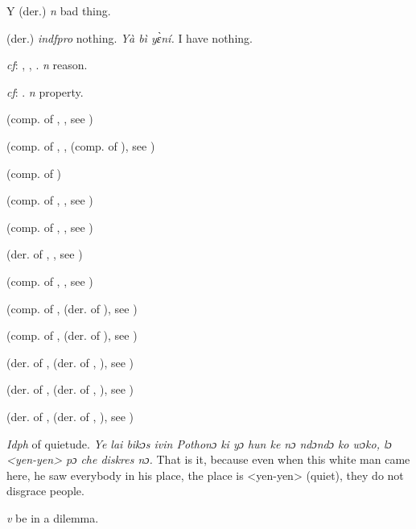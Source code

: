 \begin{letter}{Y}
 (der.) \textit{n} bad thing. 

 (der.) \textit{indfpro} nothing. \textit{Yà bì yɛ̀ní.} I have nothing.

 \textit{cf}: , , . \textit{n} reason.

 \textit{cf}: . \textit{n} property.

 (comp. of , , see ) 

 (comp. of , ,  (comp. of ), see ) 

 (comp. of ) 

 (comp. of , , see ) 

 (comp. of , , see ) 

 (der. of , , see ) 

 (comp. of , , see ) 

 (comp. of ,  (der. of ), see ) 

 (comp. of ,  (der. of ), see ) 

 (der. of ,  (der. of , ), see ) 

 (der. of ,  (der. of , ), see ) 

 (der. of ,  (der. of , ), see ) 

 \textit{Idph} of quietude. \textit{Ye lai bikɔs ivin Pothonɔ ki yɔ hun ke nɔ ndɔndɔ ko wɔko, lɔ <yen-yen> pɔ che diskres nɔ.} That is it, because even when this white man came here, he saw everybody in his place, the place is <yen-yen> (quiet), they do not disgrace people.

 \textit{v} be in a dilemma.


\end{letter}
